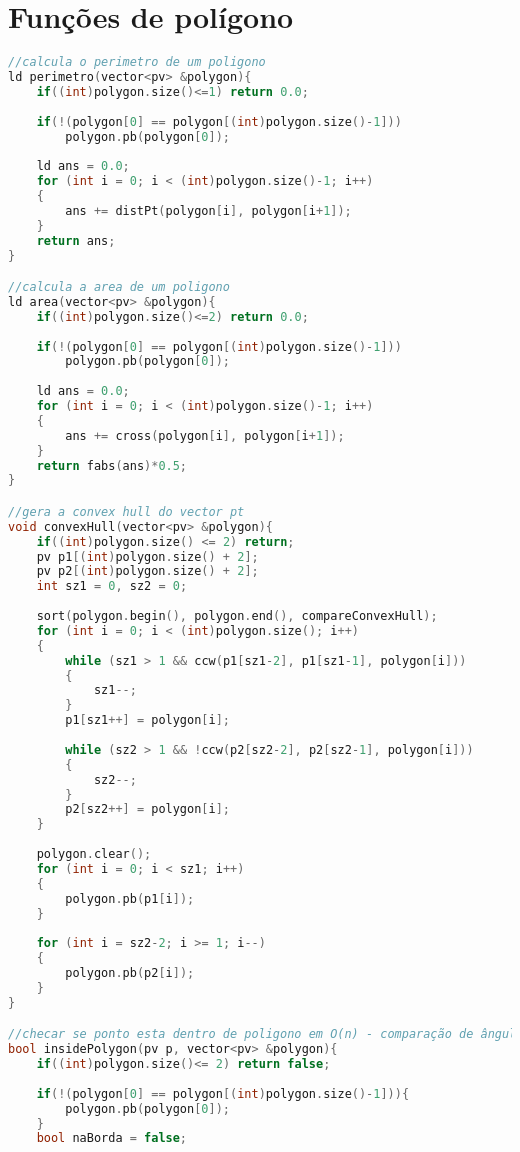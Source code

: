\documentclass[12pt,a4paper, twoside]{report}
\begin{document}
\section{Funções de polígono}
\noindent\begin{lstlisting}[caption=Funções de polígono,language=C++]
//calcula o perimetro de um poligono       
ld perimetro(vector<pv> &polygon){
    if((int)polygon.size()<=1) return 0.0;
    
    if(!(polygon[0] == polygon[(int)polygon.size()-1]))
        polygon.pb(polygon[0]);
    
    ld ans = 0.0;
    for (int i = 0; i < (int)polygon.size()-1; i++)
    {
        ans += distPt(polygon[i], polygon[i+1]);
    }
    return ans;
}

//calcula a area de um poligono    
ld area(vector<pv> &polygon){
    if((int)polygon.size()<=2) return 0.0;
    
    if(!(polygon[0] == polygon[(int)polygon.size()-1]))
        polygon.pb(polygon[0]);
    
    ld ans = 0.0;
    for (int i = 0; i < (int)polygon.size()-1; i++)
    {
        ans += cross(polygon[i], polygon[i+1]);
    }
    return fabs(ans)*0.5;
}

//gera a convex hull do vector pt    
void convexHull(vector<pv> &polygon){
    if((int)polygon.size() <= 2) return;
    pv p1[(int)polygon.size() + 2];
    pv p2[(int)polygon.size() + 2];
    int sz1 = 0, sz2 = 0;
    
    sort(polygon.begin(), polygon.end(), compareConvexHull);
    for (int i = 0; i < (int)polygon.size(); i++)
    {
        while (sz1 > 1 && ccw(p1[sz1-2], p1[sz1-1], polygon[i]))
        {
            sz1--;
        }
        p1[sz1++] = polygon[i];
        
        while (sz2 > 1 && !ccw(p2[sz2-2], p2[sz2-1], polygon[i]))
        {
            sz2--;
        }
        p2[sz2++] = polygon[i];
    }
    
    polygon.clear();
    for (int i = 0; i < sz1; i++)
    {
        polygon.pb(p1[i]);
    }
    
    for (int i = sz2-2; i >= 1; i--)
    {
        polygon.pb(p2[i]);
    }
}

//checar se ponto esta dentro de poligono em O(n) - comparação de ângulo    
bool insidePolygon(pv p, vector<pv> &polygon){
    if((int)polygon.size()<= 2) return false;
    
    if(!(polygon[0] == polygon[(int)polygon.size()-1])){
        polygon.pb(polygon[0]);
    }
    bool naBorda = false;
    

\end{lstlisting}
\end{document}

